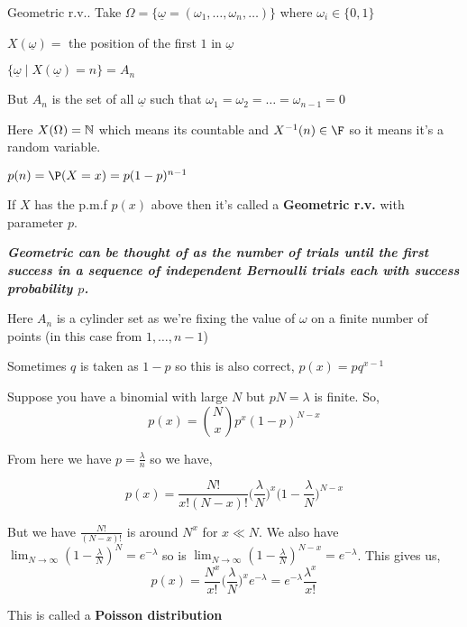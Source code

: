 \begin{eg}
    Geometric r.v.. Take $\Omega = \{\underline \omega = (\omega_1, \dots, \omega_n, \dots)\} $ where $\omega_i \in \{0, 1\} $ 

    \vspace{1em}

    $X(\underline \omega) =$ the position of the first  $1$ in $\underline \omega$

    \vspace{1em}

    $\{\underline \omega \mid X(\underline \omega) = n\} = A_n $

    But $A_n$ is the set of all $\underline \omega $ such that  $\omega_1 = \omega_2 = \dots =  \omega_{n - 1} = 0$


    Here $X(\Omega) = \mathbb{N}$ which means its countable and $X^{-1}(n) \in \F$ so it means it's a random variable.

    \vspace{1em}

    $p(n) = \P(X = x) = p(1 -  p)^{n - 1}$


    If $X$ has the p.m.f  $p(x)$ above then it's called a \textbf{Geometric r.v.} with parameter $p$.

\end{eg}
\begin{remark}
	\textbf{\emph{Geometric can be thought of as the number of trials until the first success in a sequence of independent Bernoulli trials each with success probability $p$.}}
\end{remark}
\begin{remark}
    Here $A_n$ is a cylinder set as we're fixing the value of $\omega$ on a finite number of points (in this case from $1, \dots, n - 1$)
\end{remark}
\begin{remark}
    Sometimes $q$ is taken as $1 - p$ so this is also correct, $p(x) = pq^{x - 1}$ 
\end{remark}


\begin{eg}
    Suppose you have a binomial with large  $N$ but  $pN = \lambda$ is finite. So, 
    $$ p(x) = {N \choose x}p^{x} (1 - p)^{N - x} $$ 

    From here we have $p= \frac{\lambda}{n}$ so we have, 


    $$ p(x) = \frac{N!}{x! (N - x)!} \bigg (\frac{\lambda}{N} \bigg )^{x}\bigg (1 - \frac{\lambda}{N}\bigg )^{N -x }$$ 

    But we have $\frac{N!}{(N - x)!} $ is around $N^{x}$ for $x \ll N$. We also have  $\lim_{N \to \infty} (1 - \frac{\lambda}{N})^{N}= e^{-\lambda}$ so is $\lim_{N \to \infty} (1 - \frac{\lambda}{N})^{N - x} = e^{-\lambda}$. This gives us, 
    $$ p(x) = \frac{N^{x}}{x!} \bigg (\frac{\lambda}{N} \bigg )^{x} e^{-\lambda} = e^{-\lambda} \frac{\lambda ^{x}}{x!}$$ 

    This is called a \textbf{Poisson distribution} 
\end{eg}

